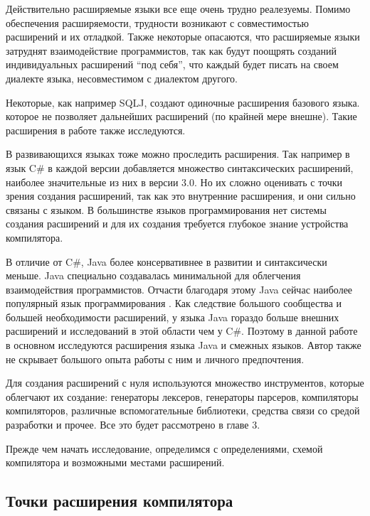 \documentclass[a4paper,12pt]{article}
\begin{document}
Действительно расширяемые языки все еще очень трудно реалезуемы.
Помимо обеспечения расширяемости, трудности возникают с совместимостью
расширений и их отладкой. Также некоторые опасаются, что расширяемые языки
затруднят взаимодействие программистов, так как будут поощрять созданий
индивидуальных расширений ``под себя'', что каждый будет писать на своем
диалекте языка, несовместимом с диалектом другого.

Некоторые, как например SQLJ, создают одиночные расширения базового языка. 
которое не позволяет дальнейших расширений (по крайней мере внешне). Такие
расширения в работе также исследуются.

В развивающихся языках тоже можно проследить расширения. Так например в язык C\#
в каждой версии добавляется множество синтаксических расширений, наиболее
значительные из них в версии 3.0. Но их сложно оценивать с точки зрения
создания расширений, так как это внутренние расширения, и они сильно связаны с
языком. В большинстве языков программирования нет системы создания расширений и
для их создания требуется глубокое знание устройства компилятора.

В отличие от C\#, Java более консервативнее в развитии и синтаксически меньше.
Java специально создавалась минимальной для облегчения взаимодействия
программистов. Отчасти благодаря этому Java сейчас наиболее популярный язык
программирования \cite{tiobe}. Как следствие большого сообщества и большей
необходимости расширений, у языка Java гораздо больше внешних расширений и
исследований в этой области чем у C\#. Поэтому в данной работе в основном
исследуются расширения языка Java и смежных языков. Автор также не скрывает
большого опыта работы с ним и личного предпочтения.

Для создания расширений с нуля используются множество инструментов, которые
облегчают их создание: генераторы лексеров, генераторы парсеров, компиляторы
компиляторов, различные вспомогательные библиотеки, средства связи со средой
разработки и прочее. Все это будет рассмотрено в главе 3.

Прежде чем начать исследование, определимся с определениями, схемой компилятора
и возможными местами расширений.

\subsection{Точки расширения компилятора}
\end{document}
